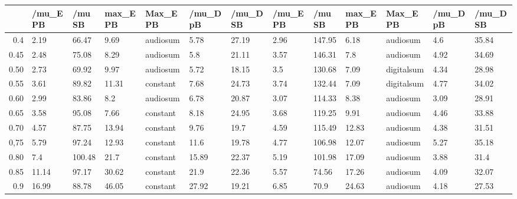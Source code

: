\begin{table}[ht]
\centering
\begin{tabular}{rllllllllllll}
  \hline
 & /mu\_E PB & /mu SB & max\_E PB & Max\_E PB & /mu\_D pB & /mu\_D SB & /mu\_E PB & /mu SB & max\_E PB & Max\_E PB & /mu\_D pB & /mu\_D SB \\ 
  \hline
0.4 & 2.19 & 66.47 & 9.69 & audiosum & 5.78 & 27.19 & 2.96 & 147.95 & 6.18 & audiosum & 4.6 & 35.84 \\ 
  0.45 & 2.48 & 75.08 & 8.29 & audiosum & 5.8 & 21.11 & 3.57 & 146.31 & 7.8 & audiosum & 4.92 & 34.69 \\ 
  0.50 & 2.73 & 69.92 & 9.97 & audiosum & 5.72 & 18.15 & 3.5 & 130.68 & 7.09 & digitalsum & 4.34 & 28.98 \\ 
  0.55 & 3.61 & 89.82 & 11.31 & constant & 7.68 & 24.73 & 3.74 & 132.44 & 7.09 & digitalsum & 4.77 & 34.02 \\ 
  0.60 & 2.99 & 83.86 & 8.2 & audiosum & 6.78 & 20.87 & 3.07 & 114.33 & 8.38 & audiosum & 3.09 & 28.91 \\ 
  0.65 & 3.58 & 95.08 & 7.66 & constant & 8.18 & 24.95 & 3.68 & 119.25 & 9.91 & audiosum & 4.46 & 33.88 \\ 
  0.70 & 4.57 & 87.75 & 13.94 & constant & 9.76 & 19.7 & 4.59 & 115.49 & 12.83 & audiosum & 4.38 & 31.51 \\ 
  0,75 & 5.79 & 97.24 & 12.93 & constant & 11.6 & 19.78 & 4.77 & 106.98 & 12.07 & audiosum & 5.27 & 35.18 \\ 
  0.80 & 7.4 & 100.48 & 21.7 & constant & 15.89 & 22.37 & 5.19 & 101.98 & 17.09 & audiosum & 3.88 & 31.4 \\ 
  0.85 & 11.14 & 97.17 & 30.62 & constant & 21.9 & 22.36 & 5.57 & 74.56 & 17.26 & audiosum & 4.09 & 32.07 \\ 
  0.9 & 16.99 & 88.78 & 46.05 & constant & 27.92 & 19.21 & 6.85 & 70.9 & 24.63 & audiosum & 4.18 & 27.53 \\ 
   \hline
\end{tabular}
\end{table}
